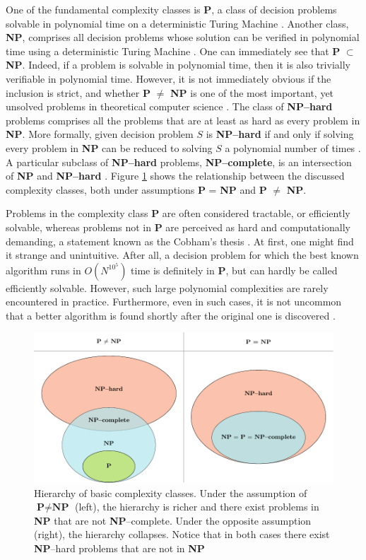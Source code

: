 One of the fundamental complexity classes is \textbf{P}, a class of decision
problems solvable in polynomial time on a deterministic Turing Machine
\cite{arora}. Another class, \textbf{NP}, comprises all decision problems whose
solution can be verified in polynomial time using a deterministic Turing
Machine \cite{arora}. One can immediately see that \textbf{P} $\subset$
\textbf{NP}. Indeed, if a problem is solvable in polynomial time, then it is
also trivially verifiable in polynomial time. However, it is not immediately
obvious if the inclusion is strict, and whether \textbf{P} $\ne$ \textbf{NP} is
one of the most important, yet unsolved problems in theoretical computer
science \cite{fortnow}. The class of \textbf{NP--hard} problems comprises all
the problems that are at least as hard as every problem in \textbf{NP}. More
formally, given decision problem $S$ is \textbf{NP--hard} if and only if
solving every problem in \textbf{NP} can be reduced to solving $S$ a polynomial
number of times \cite{arora}. A particular subclass of \textbf{NP--hard}
problems, \textbf{NP--complete}, is an intersection of \textbf{NP} and
\textbf{NP--hard} \cite{arora}. Figure \ref{fig:complexity} shows the
relationship between the discussed complexity classes, both under assumptions
\textbf{P} = \textbf{NP} and \textbf{P} $\ne$ \textbf{NP}.

Problems in the complexity class \textbf{P} are often considered tractable, or
efficiently solvable, whereas problems not in \textbf{P} are perceived as hard
and computationally demanding, a statement known as the Cobham's thesis
\cite{cobham, arora}. At first, one might find it strange and unintuitive.
After all, a decision problem for which the best known algorithm runs in
$O(N^{10^5})$ time is definitely in \textbf{P}, but can hardly be called
efficiently solvable. However, such large polynomial complexities are rarely
encountered in practice. Furthermore, even in such cases, it is not uncommon
that a better algorithm is found shortly after the original one is discovered
\cite{arora}.

\begin{figure}
  \includegraphics[width=\textwidth]{figures/complexity_new.pdf}
  \caption{Hierarchy of basic complexity classes. Under the assumption of $\textbf{P} \ne
      \textbf{NP}$ (left), the hierarchy is richer and there exist problems in
    \textbf{NP} that are not \textbf{NP}--complete. Under the opposite assumption
    (right), the hierarchy collapses. Notice that in both cases there exist
    \textbf{NP}--hard problems that are not in \textbf{NP} } \label{fig:complexity}
\end{figure}

